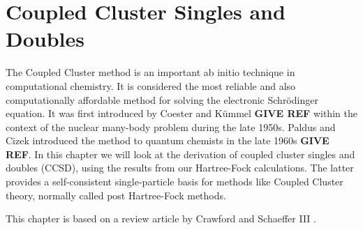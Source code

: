 \documentclass[a4paper,norsk,11pt,twoside]{report}
\begin{document}
\chapter{Coupled Cluster Singles and Doubles}
The Coupled Cluster method is an important ab initio technique in
computational chemistry. It is considered the most reliable and also
computationally affordable method for solving the electronic
Schr\"{o}dinger equation. It was first introduced by Coester and
K\"ummel {\bf GIVE REF} within the context of the nuclear many-body
problem during the late 1950s. Paldus and Cizek introduced the method
to quantum chemists in the late 1960s {\bf GIVE REF}.  In this chapter
we will look at the derivation of coupled cluster singles and doubles
(CCSD), using the results from our Hartree-Fock calculations. The
latter provides a self-consistent single-particle basis for methods
like Coupled Cluster theory, normally called post Hartree-Fock methods. 

This chapter is based on a review article by  Crawford and Schaeffer III \cite{ccsdbook11}. 
\end{document}
